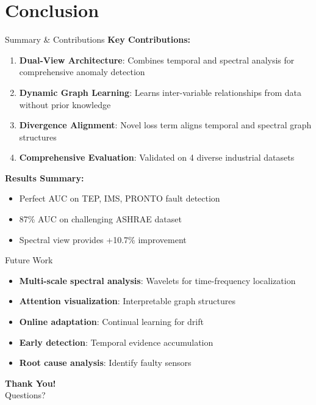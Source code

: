 \documentclass[aspectratio=169,11pt]{beamer}
\begin{document}
\section{Conclusion}

\begin{frame}{Summary \& Contributions}
    \textbf{Key Contributions:}
    \begin{enumerate}
        \item \textbf{Dual-View Architecture}: Combines temporal and spectral analysis for comprehensive anomaly detection
        \item \textbf{Dynamic Graph Learning}: Learns inter-variable relationships from data without prior knowledge
        \item \textbf{Divergence Alignment}: Novel loss term aligns temporal and spectral graph structures
        \item \textbf{Comprehensive Evaluation}: Validated on 4 diverse industrial datasets
    \end{enumerate}

    \vspace{0.5cm}
    \textbf{Results Summary:}
    \begin{itemize}
        \item Perfect AUC on TEP, IMS, PRONTO fault detection
        \item 87\% AUC on challenging ASHRAE dataset
        \item Spectral view provides +10.7\% improvement
    \end{itemize}
\end{frame}

\begin{frame}{Future Work}
    \begin{itemize}
        \item \textbf{Multi-scale spectral analysis}: Wavelets for time-frequency localization
        \item \textbf{Attention visualization}: Interpretable graph structures
        \item \textbf{Online adaptation}: Continual learning for drift
        \item \textbf{Early detection}: Temporal evidence accumulation
        \item \textbf{Root cause analysis}: Identify faulty sensors
    \end{itemize}

    \vspace{1cm}
    \centering
    \Large\textbf{Thank You!}\\
    \vspace{0.5cm}
    \normalsize Questions?
\end{frame}
\end{document}
